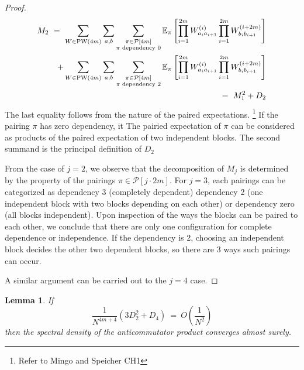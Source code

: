 \documentclass{article}
\newtheorem{lemma}{Lemma}
\newcommand{\PW}{\textnormal{PW}}
\newcommand{\E}{\mathbb{E}}
\begin{document}
\begin{proof}
\begin{eqnarray}
    \begin{split}
    M_2 \ = \ 
    \sum_{W \in \PW(4m)} \sum_{a, b} \sum_{\substack{\pi \in \mathcal{P}[4m]\\
    \pi \textnormal{ dependency 0}
    }} 
    \E_\pi\left[
        \prod_{i = 1}^{2m} 
            W^{(i)}_{a_ia_{i + 1}}
        \prod_{i = 1}^{2m}
W^{(i + 2m)}_{b_ib_{i + 1}}
    \right] \\
    + 
\sum_{W \in \PW(4m)} \sum_{a, b} \sum_{\substack{\pi \in \mathcal{P}[4m]\\
    \pi \textnormal{ dependency 2}
}} 
    \E_\pi\left[
        \prod_{i = 1}^{2m} 
            W^{(i)}_{a_ia_{i + 1}}
        \prod_{i = 1}^{2m}
W^{(i + 2m)}_{b_ib_{i + 1}}
    \right] 
    \end{split} \\ 
    \ = \ M_1^2 + D_2
\end{eqnarray}
The last equality follows from the nature of the paired expectations. 
\footnote{Refer to Mingo and Speicher CH1} If the pairing $\pi$ has zero dependency, it 
The pairied expectation of $\pi$ can be considered as products of 
the paired expectation of two independent blocks. The second summand 
is the principal definition of $D_2$

From the case of $j = 2$, we observe that the decomposition of $M_j$ 
is determined by the property of the pairings $\pi \in \mathcal P[j\cdot 2m]$. 
For $j = 3$, each pairings can be categorized as dependency 3 (completely dependent) 
dependency 2 (one independent block with two blocks depending on each other)
or dependency zero (all blocks independent). Upon inspection of the ways 
the blocks can be paired to each other, we conclude that there are 
only one configuration for complete dependence or independence. 
If the dependency is 2, choosing an independent block decides 
the other two dependent blocks, so there are 3 ways such pairings can occur. 

A similar argument can be carried out to the $j = 4$ case. 

\end{proof}

\begin{lemma}\label{thm:Dependencies}
    If 
    \begin{equation}\label{eqn:simpleForthMom}
        \frac 1 {N^{4m + 4}} (3D_2^2 + D_4) \ = \ O\left(
            \frac 1 {N^2}
        \right)
    \end{equation}
    then the spectral density of the anticommutator product converges almost surely. 
\end{lemma}
\end{document}
